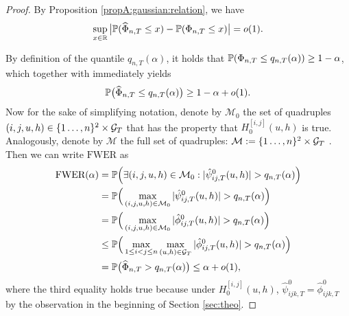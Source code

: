 \documentclass[a4paper,12pt]{article}
\makeatletter
\renewcommand{\eqref}[1]{\tagform@{\ref{#1}}}
\makeatother
\begin{document}
\begin{proof}
By Proposition \ref{propA:gaussian:relation}, we have
\begin{equation}\label{eqA:gaussian:relation}
\sup_{x \in \mathbb{R}} \big| \mathbb{P}(\widehat{\Phi}_{n, T} \le x) - \mathbb{P}(\Phi_{n,T} \le x) \big| = o(1).
\end{equation}

By definition of the quantile $q_{n, T}(\alpha)$, it holds that $\mathbb{P}(\Phi_{n, T} \le q_{n, T}(\alpha)) \ge 1-\alpha$, which together with \eqref{eqA:gaussian:relation} immediately yields
\begin{equation}\label{eq:probbound-Psihat}
\mathbb{P} \big( \widehat{\Phi}_{n, T} \le q_{n, T}(\alpha) \big) \ge 1 - \alpha + o(1).
\end{equation}
Now for the sake of simplifying notation, denote by $\mathcal{M}_0$ the set of quadruples \linebreak $(i, j, u, h) \in \{1\ldots, n\}^2 \times \mathcal{G}_T$ that has the property that $H_0^{[i, j]}(u, h)$ is true. Analogously, denote by $\mathcal{M}$ the full set of quadruples: $\mathcal{M}: = \{1\ldots, n\}^2 \times \mathcal{G}_T$ . Then we can write $\text{FWER}$ as
\begin{align*}
\text{FWER}(\alpha)
 & = \mathbb{P} \Big( \exists (i,j,u, h) \in \mathcal{M}_0: |\hat{\psi}^0_{ij,T}(u, h)| > q_{n, T}(\alpha) \Big) \\
 & = \mathbb{P} \Big( \max_{(i, j, u, h) \in \mathcal{M}_0} |\hat{\psi}^0_{ij,T}(u, h)| > q_{n, T}(\alpha) \Big) \\
 & = \mathbb{P} \Big( \max_{(i,j,u, h) \in \mathcal{M}_0} |\hat{\phi}^0_{ij,T}(u, h)| > q_{n, T}(\alpha) \Big) \\
 & \le \mathbb{P} \Big( \max_{1 \le i < j \le n} \max_{(u, h) \in \mathcal{G}_T} |\hat{\phi}_{ij,T}^0(u, h)| > q_{n, T}(\alpha) \Big) \\
 & = \mathbb{P} \big( \widehat{\Phi}_{n, T} > q_{n, T}(\alpha) \big) \le \alpha + o(1),
\end{align*}
where the third equality holds true because under $H_0^{[i, j]}(u, h)$, $\hat{\psi}^0_{ijk,T} = \hat{\phi}^0_{ijk,T}$ by the observation in the beginning of Section \ref{sec:theo}.
\end{proof}
\end{document}
